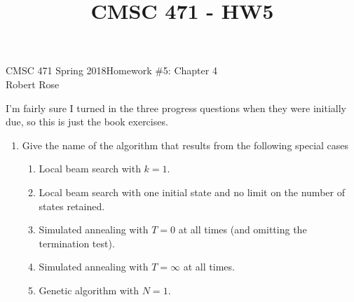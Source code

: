 \documentclass[12pt]{article}
\title{CMSC 471 - HW5}
\begin{document}
CMSC 471 Spring 2018\hfill Homework \#5: Chapter 4\\
Robert Rose

\hrulefill
I'm fairly sure I turned in the three progress questions when they were initially due, so this is just the book exercises.
\begin{enumerate}
\item Give the name of the algorithm that results from the following special cases
  \begin{enumerate}
  \item Local beam search with $k = 1$.
  \item Local beam search with one initial state and no limit on the number of states retained.
  \item Simulated annealing with $T = 0$ at all times (and omitting the termination test).
  \item Simulated annealing with $T = \infty$ at all times.
  \item Genetic algorithm with $N = 1$.

  \end{enumerate}
\newpage

\end{enumerate}
\end{document}
